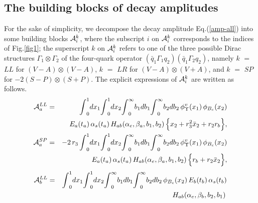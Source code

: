\documentclass[preprint,superscriptaddress,nofootinbib]{revtex4}
\begin{document}
  \begin{appendix}
  \section{The building blocks of decay amplitudes}
  \label{blocks}
  For the sake of simplicity,
  we decompose the decay amplitude Eq.(\ref{amp-all})
  into some building blocks ${\cal A}_{i}^{k}$, where
  the subscript $i$ on ${\cal A}_{i}^{k}$ corresponds to
  the indices of Fig.\ref{fig1};
  the superscript $k$ on ${\cal A}_{i}^{k}$ refers
  to one of the three possible Dirac structures
  ${\Gamma}_{1}{\otimes}{\Gamma}_{2}$ of the
  four-quark operator
  $(\bar{q}_{1}{\Gamma}_{1}q_{2})(\bar{q}_{1}{\Gamma}_{2}q_{2})$,
  namely
  $k$ $=$ $LL$ for $(V-A){\otimes}(V-A)$,
  $k$ $=$ $LR$ for $(V-A){\otimes}(V+A)$, and
  $k$ $=$ $SP$ for $-2(S-P){\otimes}(S+P)$.
  The explicit expressions of ${\cal A}_{i}^{k}$
  are written as follows.
   \begin{eqnarray}
  {\cal A}_{a}^{LL} &=&
  {\int}_{0}^{1}dx_{1} {\int}_{0}^{1}dx_{2}
  {\int}_{0}^{\infty}b_{1} db_{1}
  {\int}_{0}^{\infty}b_{2} db_{2}\,
  {\phi}_{\Upsilon}^{v}(x_{1})\,
  {\phi}_{B_{c}}(x_{2})
   \nonumber \\ & &
  E_{a}(t_{a})\, {\alpha}_{s}(t_{a})\,
  H_{ab}({\alpha}_{e},{\beta}_{a},b_{1},b_{2})\,
   \Big\{ x_{2}+r_{3}^{2}\bar{x}_{2}
   + r_{2}r_{b} \Big\}
   \label{amp-figa-01}, \\
  {\cal A}_{a}^{SP} &=&
   -2\,r_{3}\,{\int}_{0}^{1}dx_{1} {\int}_{0}^{1}dx_{2}
  {\int}_{0}^{\infty}b_{1} db_{1}
  {\int}_{0}^{\infty}b_{2} db_{2}\,
  {\phi}_{\Upsilon}^{v}(x_{1})\,
  {\phi}_{B_{c}}(x_{2})
   \nonumber \\ & &
  E_{a}(t_{a})\, {\alpha}_{s}(t_{a})\,
  H_{ab}({\alpha}_{e},{\beta}_{a},b_{1},b_{2})\,
   \Big\{ r_{b}+r_{2}\bar{x}_{2} \Big\}
   \label{amp-figa-03},
   \end{eqnarray}
   \begin{eqnarray}
  {\cal A}_{b}^{LL} &=&
  {\int}_{0}^{1}dx_{1} {\int}_{0}^{1}dx_{2}
  {\int}_{0}^{\infty}b_{1} db_{1}
  {\int}_{0}^{\infty}b_{2} db_{2}\,
  {\phi}_{B_{c}}(x_{2})\, E_{b}(t_{b})\,
  {\alpha}_{s}(t_{b})
   \nonumber \\ & &
  H_{ab}({\alpha}_{e},{\beta}_{b},b_{2},b_{1})\,

\end{eqnarray}
\end{appendix}
\end{document}
